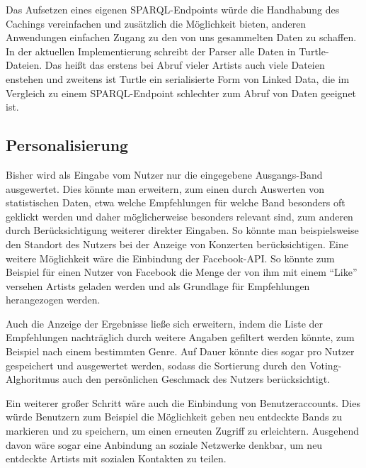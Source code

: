 Das Aufsetzen eines eigenen SPARQL-Endpoints würde die Handhabung des Cachings vereinfachen und zusätzlich die Möglichkeit bieten, anderen Anwendungen einfachen Zugang
zu den von uns gesammelten Daten zu schaffen. In der aktuellen Implementierung schreibt der Parser alle Daten in Turtle-Dateien. Das heißt das erstens bei Abruf vieler Artists auch viele Dateien enstehen und zweitens ist Turtle ein serialisierte Form von Linked Data, die im Vergleich zu einem SPARQL-Endpoint schlechter zum Abruf von Daten geeignet ist. 


\subsection{Personalisierung}
Bisher wird als Eingabe vom Nutzer nur die eingegebene Ausgangs-Band ausgewertet. Dies könnte man erweitern, zum einen durch Auswerten von statistischen Daten, etwa welche Empfehlungen für welche Band besonders oft geklickt werden und daher möglicherweise besonders relevant sind, zum anderen durch Berücksichtigung weiterer direkter Eingaben. So könnte man beispielsweise den Standort des Nutzers bei der Anzeige von Konzerten berücksichtigen. Eine weitere Möglichkeit wäre die Einbindung der Facebook-API. So könnte zum Beispiel für einen Nutzer von Facebook die Menge der von ihm mit einem “Like” versehen Artists geladen werden und als Grundlage für Empfehlungen herangezogen werden.

Auch die Anzeige der Ergebnisse ließe sich erweitern, indem die Liste der Empfehlungen nachträglich durch weitere Angaben gefiltert werden könnte, zum Beispiel nach einem bestimmten Genre. Auf Dauer könnte dies sogar pro Nutzer gespeichert und ausgewertet werden, sodass die Sortierung durch den Voting-Alghoritmus auch den persönlichen Geschmack des Nutzers berücksichtigt.

Ein weiterer großer Schritt wäre auch die Einbindung von Benutzeraccounts. Dies würde Benutzern zum Beispiel die Möglichkeit geben neu entdeckte Bands zu markieren und zu speichern, um einen erneuten Zugriff zu erleichtern. Ausgehend davon wäre sogar eine Anbindung an soziale Netzwerke denkbar, um neu entdeckte Artists mit sozialen Kontakten zu teilen.